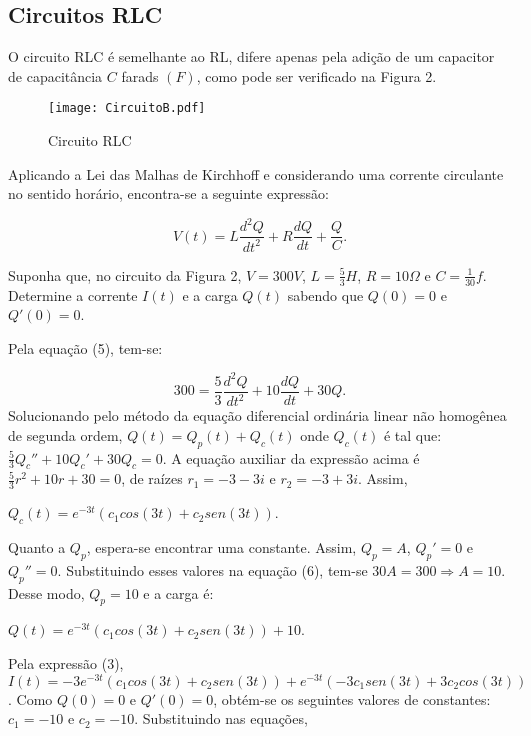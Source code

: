 \documentclass[10pt,twoside,a4paper]{article}
\begin{document}
\subsection*{Circuitos RLC}

O circuito RLC é semelhante ao RL, difere apenas pela adição de um capacitor de capacitância $C$ farads $(F)$, como pode ser verificado na Figura 2.

\begin{figure}[!htb]\label{circuito}
\centering
\texttt{[image: CircuitoB.pdf]}
 \caption{Circuito RLC}
\end{figure}

Aplicando a Lei das Malhas de Kirchhoff e considerando uma corrente circulante no sentido horário, encontra-se a seguinte expressão:

\begin{equation}
V(t) = L \frac{d^2Q}{dt^2} + R\frac{dQ}{dt} + \frac{Q}{C}.
\end{equation}

 Suponha que, no circuito da Figura 2, $V = 300 V$, $L = \displaystyle \frac{5}{3}H$, $R = 10\Omega$ e $C = \displaystyle \frac{1}{30}f$. Determine a corrente $I(t)$ e a carga $Q(t)$ sabendo que $Q(0) = 0$ e $Q'(0) = 0$.

 Pela equação (5), tem-se:

\begin{equation}
300 = \frac{5}{3}\frac{d^2Q}{dt^2} + 10\frac{dQ}{dt} + 30Q.
\end{equation}
Solucionando pelo método da equação diferencial ordinária linear não homogênea de segunda ordem, $Q(t) = Q_p(t) + Q_c(t)$ onde $Q_c(t)$ é tal que: $\displaystyle \frac{5}{3}Q_c'' + 10Q_c' + 30Q_c = 0$. 
A equação auxiliar da expressão acima é $\displaystyle \frac{5}{3}r^2 + 10r + 30 = 0$, de raízes $r_1 = -3 -3i$ e $r_2 = -3 + 3i$. Assim,
\begin{center}
$\displaystyle Q_c(t) = e^{-3t}(c_1cos(3t) + c_2sen(3t))$.
\end{center}
Quanto a $Q_p$, espera-se encontrar uma constante. Assim, $Q_p = A$, $Q_p' = 0$ e $Q_p'' = 0$. Substituindo esses valores na equação (6), tem-se $30A = 300 \Rightarrow A = 10$. Desse modo, $Q_p = 10$ e a carga é: 

\begin{center}
$Q(t) = e^{-3t}(c_1cos(3t) + c_2sen(3t)) + 10$.
\end{center}
Pela expressão (3), $I(t) = -3e^{-3t}(c_1cos(3t) + c_2sen(3t)) + e^{-3t}(-3c_1sen(3t) + 3c_2cos(3t))$. 
Como $Q(0) = 0$ e $Q'(0) = 0$, obtém-se os seguintes valores de constantes: $c_1 = -10$ e $c_2 = -10$. Substituindo nas equações,
\end{document}
